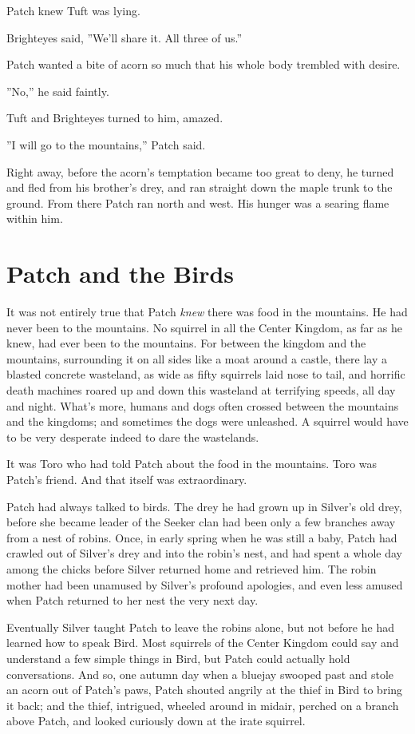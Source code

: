 \documentclass[12pt]{book}
\begin{document}
Patch knew Tuft was lying.

Brighteyes said, ''We'll share it. All three of us.''

Patch wanted a bite of acorn so much that his whole body trembled with desire.

''No,'' he said faintly.

Tuft and Brighteyes turned to him, amazed.

''I will go to the mountains,'' Patch said.

Right away, before the acorn's temptation became too great to deny, he turned and fled from his brother's drey, and ran straight down the maple trunk to the ground. From there Patch ran north and west. His hunger was a searing flame within him.


\section{Patch and the Birds}

It was not entirely true that Patch {\it knew} there was food in the mountains. He had never been to the mountains. No squirrel in all the Center Kingdom, as far as he knew, had ever been to the mountains. For between the kingdom and the mountains, surrounding it on all sides like a moat around a castle, there lay a blasted concrete wasteland, as wide as fifty squirrels laid nose to tail, and horrific death machines roared up and down this wasteland at terrifying speeds, all day and night. What's more, humans and dogs often crossed between the mountains and the kingdoms; and sometimes the dogs were unleashed. A squirrel would have to be very desperate indeed to dare the wastelands.

It was Toro who had told Patch about the food in the mountains. Toro was Patch's friend. And that itself was extraordinary.

Patch had always talked to birds. The drey he had grown up in %
Silver's old drey, before she became leader of the Seeker clan %
had been only a few branches away from a nest of robins. Once, in early spring when he was still a baby, Patch had crawled out of Silver's drey and into the robin's nest, and had spent a whole day among the chicks before Silver returned home and retrieved him. The robin mother had been unamused by Silver's profound apologies, and even less amused when Patch returned to her nest the very next day.

Eventually Silver taught Patch to leave the robins alone, but not before he had learned how to speak Bird. Most squirrels of the Center Kingdom could say and understand a few simple things in Bird, but Patch could actually hold conversations. And so, one autumn day when a bluejay swooped past and stole an acorn out of Patch's paws, Patch shouted angrily at the thief in Bird to bring it back; and the thief, intrigued, wheeled around in midair, perched on a branch above Patch, and looked curiously down at the irate squirrel.
\end{document}

